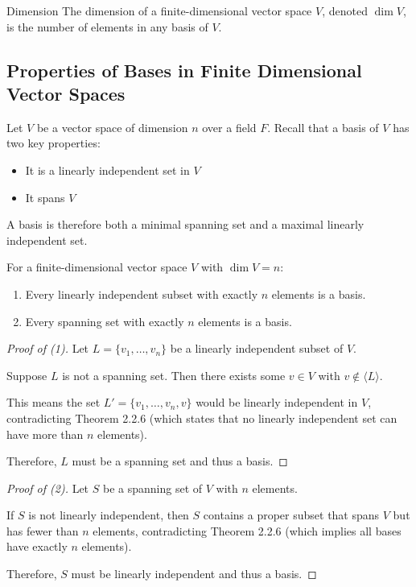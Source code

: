 \documentclass[a4paper, 9pt]{extarticle}
\begin{document}
\begin{definitionbox}{Dimension}{}
  The dimension of a finite-dimensional vector space $V$, denoted $\dim V$, is the number of elements in any basis of $V$.
\end{definitionbox}
\subsection{Properties of Bases in Finite Dimensional Vector Spaces}
Let $V$ be a vector space of dimension $n$ over a field $F$. Recall that a basis of $V$ has two key properties:
\begin{itemize}
  \item It is a linearly independent set in $V$
  \item It spans $V$
\end{itemize}

A basis is therefore both a minimal spanning set and a maximal linearly independent set.

\begin{theorembox}
  For a finite-dimensional vector space $V$ with $\dim V = n$:
  \begin{enumerate}
    \item Every linearly independent subset with exactly $n$ elements is a basis.
    \item Every spanning set with exactly $n$ elements is a basis.
  \end{enumerate}
\end{theorembox}

\begin{proof}[Proof of (1)]
  Let $L = \{v_1, \ldots, v_n\}$ be a linearly independent subset of $V$.

  Suppose $L$ is not a spanning set. Then there exists some $v \in V$ with $v \notin \langle L \rangle$.

  This means the set $L' = \{v_1, \ldots, v_n, v\}$ would be linearly independent in $V$, contradicting Theorem 2.2.6 (which states that no linearly independent set can have more than $n$ elements).

  Therefore, $L$ must be a spanning set and thus a basis.
\end{proof}

\begin{proof}[Proof of (2)]
  Let $S$ be a spanning set of $V$ with $n$ elements.

  If $S$ is not linearly independent, then $S$ contains a proper subset that spans $V$ but has fewer than $n$ elements, contradicting Theorem 2.2.6 (which implies all bases have exactly $n$ elements).

  Therefore, $S$ must be linearly independent and thus a basis.
\end{proof}
\end{document}
